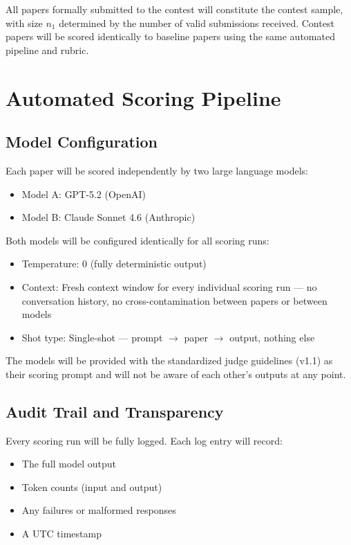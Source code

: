 \documentclass[11pt]{article}
\begin{document}
All papers formally submitted to the contest will constitute the contest sample, with size $n_1$ determined by the number of valid submissions received. Contest papers will be scored identically to baseline papers using the same automated pipeline and rubric.

\section{Automated Scoring Pipeline}

\subsection{Model Configuration}

Each paper will be scored independently by two large language models:

\begin{itemize}
    \item Model A: GPT-5.2 (OpenAI)
    \item Model B: Claude Sonnet 4.6 (Anthropic)
\end{itemize}

Both models will be configured identically for all scoring runs:

\begin{itemize}
    \item Temperature: 0 (fully deterministic output)
    \item Context: Fresh context window for every individual scoring run --- no conversation history, no cross-contamination between papers or between models
    \item Shot type: Single-shot --- prompt $\to$ paper $\to$ output, nothing else
\end{itemize}

The models will be provided with the standardized judge guidelines (v1.1) as their scoring prompt and will not be aware of each other's outputs at any point.

\subsection{Audit Trail and Transparency}

Every scoring run will be fully logged. Each log entry will record:

\begin{itemize}
    \item The full model output
    \item Token counts (input and output)
    \item Any failures or malformed responses
    \item A UTC timestamp
\end{itemize}
\end{document}
